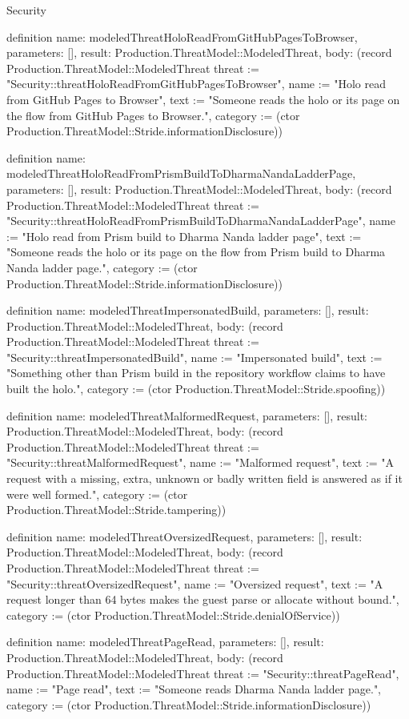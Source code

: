 \begin{lexlean}{Security}
\begin{semanticmodule}
definition{
  name: modeledThreatHoloReadFromGitHubPagesToBrowser,
  parameters: [],
  result: Production.ThreatModel::ModeledThreat,
  body: (record Production.ThreatModel::ModeledThreat {threat := "Security::threatHoloReadFromGitHubPagesToBrowser", name := "Holo read from GitHub Pages to Browser", text := "Someone reads the holo or its page on the flow from GitHub Pages to Browser.", category := (ctor Production.ThreatModel::Stride.informationDisclosure)})
}

definition{
  name: modeledThreatHoloReadFromPrismBuildToDharmaNandaLadderPage,
  parameters: [],
  result: Production.ThreatModel::ModeledThreat,
  body: (record Production.ThreatModel::ModeledThreat {threat := "Security::threatHoloReadFromPrismBuildToDharmaNandaLadderPage", name := "Holo read from Prism build to Dharma Nanda ladder page", text := "Someone reads the holo or its page on the flow from Prism build to Dharma Nanda ladder page.", category := (ctor Production.ThreatModel::Stride.informationDisclosure)})
}

definition{
  name: modeledThreatImpersonatedBuild,
  parameters: [],
  result: Production.ThreatModel::ModeledThreat,
  body: (record Production.ThreatModel::ModeledThreat {threat := "Security::threatImpersonatedBuild", name := "Impersonated build", text := "Something other than Prism build in the repository workflow claims to have built the holo.", category := (ctor Production.ThreatModel::Stride.spoofing)})
}

definition{
  name: modeledThreatMalformedRequest,
  parameters: [],
  result: Production.ThreatModel::ModeledThreat,
  body: (record Production.ThreatModel::ModeledThreat {threat := "Security::threatMalformedRequest", name := "Malformed request", text := "A request with a missing, extra, unknown or badly written field is answered as if it were well formed.", category := (ctor Production.ThreatModel::Stride.tampering)})
}

definition{
  name: modeledThreatOversizedRequest,
  parameters: [],
  result: Production.ThreatModel::ModeledThreat,
  body: (record Production.ThreatModel::ModeledThreat {threat := "Security::threatOversizedRequest", name := "Oversized request", text := "A request longer than 64 bytes makes the guest parse or allocate without bound.", category := (ctor Production.ThreatModel::Stride.denialOfService)})
}

definition{
  name: modeledThreatPageRead,
  parameters: [],
  result: Production.ThreatModel::ModeledThreat,
  body: (record Production.ThreatModel::ModeledThreat {threat := "Security::threatPageRead", name := "Page read", text := "Someone reads Dharma Nanda ladder page.", category := (ctor Production.ThreatModel::Stride.informationDisclosure)})
}


\end{semanticmodule}
\end{lexlean}
